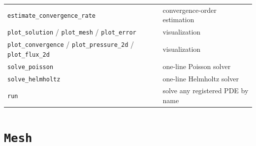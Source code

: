 \documentclass[11pt,oneside]{book}
\theoremstyle{definition}
\theoremstyle{plain}
\newcommand{\code}[1]{\texttt{#1}}
\begin{document}
\begin{longtable}{@{}L{5.0cm}L{9.4cm}@{}}
\code{estimate\_\allowbreak convergence\_\allowbreak rate} & convergence-order estimation \\
\code{plot\_\allowbreak solution} / \code{plot\_\allowbreak mesh} / \code{plot\_\allowbreak error} & visualization \\
\code{plot\_\allowbreak convergence} / \code{plot\_\allowbreak pressure\_\allowbreak 2d} / \code{plot\_\allowbreak flux\_\allowbreak 2d} & visualization \\
\code{solve\_\allowbreak poisson} & one-line Poisson solver \\
\code{solve\_\allowbreak helmholtz} & one-line Helmholtz solver \\
\code{run} & solve any registered PDE by name \\
\bottomrule
\end{longtable}
\endgroup

\section{\code{Mesh}}
\end{document}
